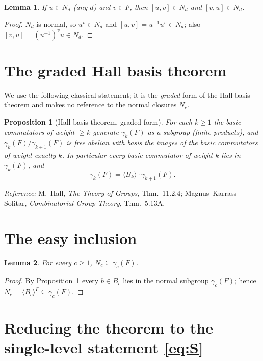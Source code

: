 \documentclass{amsart}
\newtheorem{lemma}{Lemma}
\newtheorem{proposition}{Proposition}
\theoremstyle{definition}
\theoremstyle{remark}
\begin{document}
\begin{lemma}\label{lem:caseA}
If $u\in N_d$ (any $d$) and $v\in F$, then $[u,v]\in N_d$ and $[v,u]\in N_d$.
\end{lemma}
\begin{proof}
$N_d$ is normal, so $u^{v}\in N_d$ and $[u,v]=u^{-1}u^{v}\in N_d$; also
$[v,u]=(u^{-1})^{v}u\in N_d$.
\end{proof}

\section{The graded Hall basis theorem}\label{sec:input}

We use the following classical statement; it is the \emph{graded} form of the Hall
basis theorem and makes no reference to the normal closures $N_c$.

\begin{proposition}[Hall basis theorem, graded form]\label{prop:hall}
For each $k\ge 1$ the basic commutators of weight $\ge k$ generate $\gamma_k(F)$
\emph{as a subgroup} \textup{(finite products)}, and $\gamma_k(F)/\gamma_{k+1}(F)$ is
free abelian with basis the images of the basic commutators of weight exactly $k$.
In particular every basic commutator of weight $k$ lies in $\gamma_k(F)$, and
\begin{equation}\label{eq:hall-decomp}
\gamma_k(F)=\langle B_k\rangle\cdot\gamma_{k+1}(F).
\end{equation}
\end{proposition}
\noindent\emph{Reference:} M.~Hall, \emph{The Theory of Groups}, Thm.~11.2.4;
Magnus--Karrass--Solitar, \emph{Combinatorial Group Theory}, Thm.~5.13A.

\section{The easy inclusion}\label{sec:easy}

\begin{lemma}\label{lem:easy}
For every $c\ge1$, $N_c\subseteq\gamma_c(F)$.
\end{lemma}
\begin{proof}
By Proposition~\ref{prop:hall} every $b\in B_c$ lies in the normal subgroup
$\gamma_c(F)$; hence $N_c=\langle B_c\rangle^{F}\subseteq\gamma_c(F)$.
\end{proof}

\section{Reducing the theorem to the single-level statement \eqref{eq:S}}
\label{sec:chain}
\end{document}
